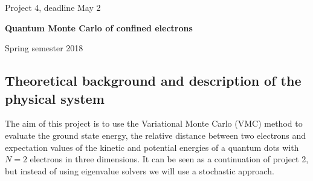 \documentclass[%
oneside,                 %
final,                   %
10pt]{article}
\begin{document}

\newcommand{\exercisesection}[1]{\subsection*{#1}}






\thispagestyle{empty}

\begin{center}
{\LARGE\bf
\begin{spacing}{1.25}
Project 4, deadline  May 2
\end{spacing}
}
\end{center}


\begin{center}
{\bf Quantum Monte Carlo of confined electrons${}^{}$} \\ [0mm]
\end{center}

\begin{center}
\end{center}
    

\begin{center}
Spring semester 2018
\end{center}

\vspace{1cm}


\subsection*{Theoretical background and description of the physical system}

The aim of this project is to use the Variational Monte Carlo (VMC)
method to evaluate the ground state energy, the relative distance between two electrons and
expectation values of the kinetic and potential energies of a quantum dots with $N=2$
electrons in three dimensions. It can be seen as a continuation of project 2, but instead of using eigenvalue solvers
we will use a stochastic approach.
\end{document}
